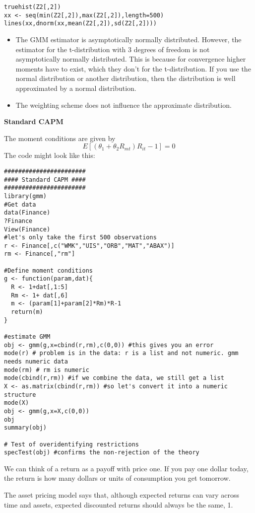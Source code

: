 \begin{Solution}{14.6}
\begin{verbatim}
truehist(Z2[,2])
xx <- seq(min(Z2[,2]),max(Z2[,2]),length=500)
lines(xx,dnorm(xx,mean(Z2[,2]),sd(Z2[,2])))
\end{verbatim}
\begin{itemize}
  \item The GMM estimator is asymptotically normally distributed.
      However, the estimator for the t-distribution with 3 degrees of
      freedom is not asymptotically normally distributed. This is because
      for convergence higher moments have to exist, which they don't for
      the t-distribution. If you use the normal distribution or another
      distribution, then the distribution is well approximated by a
      normal distribution.
  \item The weighting scheme does not influence the approximate
      distribution.
\end{itemize}
\end{Solution}
\begin{Solution}{14.7}
\textbf{Standard CAPM }

The moment conditions are given by
\begin{equation*}
  E\left[(\theta_1+\theta_2 R_{mt})R_{it}-1\right]=0
\end{equation*}
The code might look like this:
\begin{verbatim}
#######################
#### Standard CAPM ####
#######################
library(gmm)
#Get data
data(Finance)
?Finance
View(Finance)
#let's only take the first 500 observations
r <- Finance[,c("WMK","UIS","ORB","MAT","ABAX")]
rm <- Finance[,"rm"]

#Define moment conditions
g <- function(param,dat){
  R <- 1+dat[,1:5]
  Rm <- 1+ dat[,6]
  m <- (param[1]+param[2]*Rm)*R-1
  return(m)
}

#estimate GMM
obj <- gmm(g,x=cbind(r,rm),c(0,0)) #this gives you an error
mode(r) # problem is in the data: r is a list and not numeric. gmm needs numeric data
mode(rm) # rm is numeric
mode(cbind(r,rm)) #if we combine the data, we still get a list
X <- as.matrix(cbind(r,rm)) #so let's convert it into a numeric structure
mode(X)
obj <- gmm(g,x=X,c(0,0))
obj
summary(obj)

# Test of overidentifying restrictions
specTest(obj) #confirms the non-rejection of the theory
\end{verbatim}
We can think of a return as a payoff with price one. If you pay one dollar
today, the return is how many dollars or units of consumption you get
tomorrow.

The asset pricing model says that, although expected returns can vary
across time and assets, expected discounted returns should always be the
same, 1.
\end{Solution}
